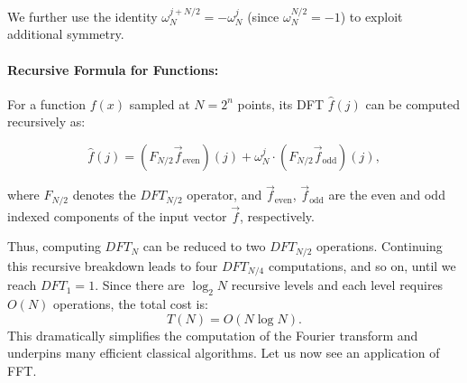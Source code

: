 We further use the identity $\omega_N^{j + N/2} = -\omega_N^j$ (since $\omega_N^{N/2} = -1$) to exploit additional symmetry.

\paragraph{Recursive Formula for Functions:} For a function $f(x)$ sampled at $N = 2^n$ points, its DFT $\hat{f}(j)$ can be computed recursively as:

\begin{equation}
    \hat{f}(j) = (F_{N/2} \vec{f}_{\text{even}})(j) + \omega_N^j \cdot (F_{N/2} \vec{f}_{\text{odd}})(j),
\end{equation}

where $F_{N/2}$ denotes the $DFT_{N/2}$ operator, and $\vec{f}_{\text{even}}$, $\vec{f}_{\text{odd}}$ are the even and odd indexed components of the input vector $\vec{f}$, respectively.

Thus, computing $DFT_N$ can be reduced to two $DFT_{N/2}$ operations. Continuing this recursive breakdown leads to four $DFT_{N/4}$ computations, and so on, until we reach $DFT_1 = 1$. Since there are $\log_2 N$ recursive levels and each level requires $O(N)$ operations, the total cost is:
\[
T(N) = O(N \log N).
\]
This dramatically simplifies the computation of the Fourier transform and underpins many efficient classical algorithms. Let us now see an application of FFT.

